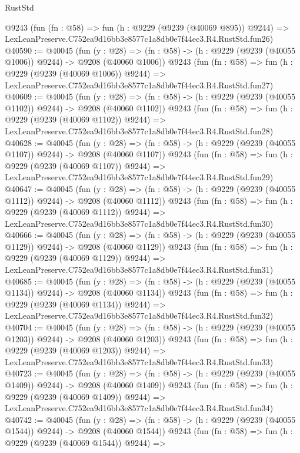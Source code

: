 \begin{lexlean}{RustStd}
\begin{coremodule}
    @9243
    (fun (fn : @58) =>
    fun (h : @9229 (@9239 (@40069 @895)) @9244) =>
    LexLeanPreserve.C752ea9d16bb3e8577c1a8db0e7f44ec3.R4.RustStd.fun26)
@40590 := @40045
    (fun (y : @28) =>
    (fn : @58) -> (h : @9229 (@9239 (@40055 @1006)) @9244) -> @9208 (@40060 @1006))
    @9243
    (fun (fn : @58) =>
    fun (h : @9229 (@9239 (@40069 @1006)) @9244) =>
    LexLeanPreserve.C752ea9d16bb3e8577c1a8db0e7f44ec3.R4.RustStd.fun27)
@40609 := @40045
    (fun (y : @28) =>
    (fn : @58) -> (h : @9229 (@9239 (@40055 @1102)) @9244) -> @9208 (@40060 @1102))
    @9243
    (fun (fn : @58) =>
    fun (h : @9229 (@9239 (@40069 @1102)) @9244) =>
    LexLeanPreserve.C752ea9d16bb3e8577c1a8db0e7f44ec3.R4.RustStd.fun28)
@40628 := @40045
    (fun (y : @28) =>
    (fn : @58) -> (h : @9229 (@9239 (@40055 @1107)) @9244) -> @9208 (@40060 @1107))
    @9243
    (fun (fn : @58) =>
    fun (h : @9229 (@9239 (@40069 @1107)) @9244) =>
    LexLeanPreserve.C752ea9d16bb3e8577c1a8db0e7f44ec3.R4.RustStd.fun29)
@40647 := @40045
    (fun (y : @28) =>
    (fn : @58) -> (h : @9229 (@9239 (@40055 @1112)) @9244) -> @9208 (@40060 @1112))
    @9243
    (fun (fn : @58) =>
    fun (h : @9229 (@9239 (@40069 @1112)) @9244) =>
    LexLeanPreserve.C752ea9d16bb3e8577c1a8db0e7f44ec3.R4.RustStd.fun30)
@40666 := @40045
    (fun (y : @28) =>
    (fn : @58) -> (h : @9229 (@9239 (@40055 @1129)) @9244) -> @9208 (@40060 @1129))
    @9243
    (fun (fn : @58) =>
    fun (h : @9229 (@9239 (@40069 @1129)) @9244) =>
    LexLeanPreserve.C752ea9d16bb3e8577c1a8db0e7f44ec3.R4.RustStd.fun31)
@40685 := @40045
    (fun (y : @28) =>
    (fn : @58) -> (h : @9229 (@9239 (@40055 @1134)) @9244) -> @9208 (@40060 @1134))
    @9243
    (fun (fn : @58) =>
    fun (h : @9229 (@9239 (@40069 @1134)) @9244) =>
    LexLeanPreserve.C752ea9d16bb3e8577c1a8db0e7f44ec3.R4.RustStd.fun32)
@40704 := @40045
    (fun (y : @28) =>
    (fn : @58) -> (h : @9229 (@9239 (@40055 @1203)) @9244) -> @9208 (@40060 @1203))
    @9243
    (fun (fn : @58) =>
    fun (h : @9229 (@9239 (@40069 @1203)) @9244) =>
    LexLeanPreserve.C752ea9d16bb3e8577c1a8db0e7f44ec3.R4.RustStd.fun33)
@40723 := @40045
    (fun (y : @28) =>
    (fn : @58) -> (h : @9229 (@9239 (@40055 @1409)) @9244) -> @9208 (@40060 @1409))
    @9243
    (fun (fn : @58) =>
    fun (h : @9229 (@9239 (@40069 @1409)) @9244) =>
    LexLeanPreserve.C752ea9d16bb3e8577c1a8db0e7f44ec3.R4.RustStd.fun34)
@40742 := @40045
    (fun (y : @28) =>
    (fn : @58) -> (h : @9229 (@9239 (@40055 @1544)) @9244) -> @9208 (@40060 @1544))
    @9243
    (fun (fn : @58) =>
    fun (h : @9229 (@9239 (@40069 @1544)) @9244) =>

\end{coremodule}
\end{lexlean}
